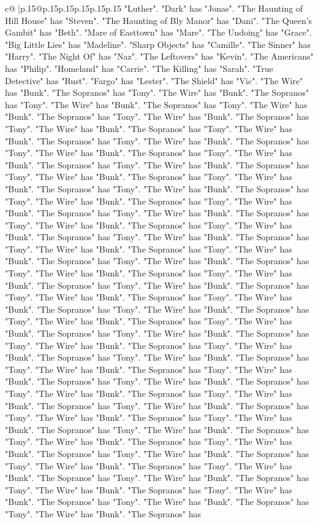 \documentclass{article}
\begin{document}
{\begin{supertabular}{c@{$\;$}|p{.15\linewidth}@{}p{.15\linewidth}p{.15\linewidth}p{.15\linewidth}p{.15\linewidth}p{.15\linewidth}}
{{{"Luther". "Dark" has "Jonas". "The Haunting of Hill House" has "Steven". "The Haunting of Bly Manor" has "Dani". "The Queen's Gambit" has "Beth". "Mare of Easttown" has "Mare". "The Undoing" has "Grace". "Big Little Lies" has "Madeline". "Sharp Objects" has "Camille". "The Sinner" has "Harry". "The Night Of" has "Naz". "The Leftovers" has "Kevin". "The Americans" has "Philip". "Homeland" has "Carrie". "The Killing" has "Sarah". "True Detective" has "Rust". "Fargo" has "Lester". "The Shield" has "Vic". "The Wire" has "Bunk". "The Sopranos" has "Tony". "The Wire" has "Bunk". "The Sopranos" has "Tony". "The Wire" has "Bunk". "The Sopranos" has "Tony". "The Wire" has "Bunk". "The Sopranos" has "Tony". "The Wire" has "Bunk". "The Sopranos" has "Tony". "The Wire" has "Bunk". "The Sopranos" has "Tony". "The Wire" has "Bunk". "The Sopranos" has "Tony". "The Wire" has "Bunk". "The Sopranos" has "Tony". "The Wire" has "Bunk". "The Sopranos" has "Tony". "The Wire" has "Bunk". "The Sopranos" has "Tony". "The Wire" has "Bunk". "The Sopranos" has "Tony". "The Wire" has "Bunk". "The Sopranos" has "Tony". "The Wire" has "Bunk". "The Sopranos" has "Tony". "The Wire" has "Bunk". "The Sopranos" has "Tony". "The Wire" has "Bunk". "The Sopranos" has "Tony". "The Wire" has "Bunk". "The Sopranos" has "Tony". "The Wire" has "Bunk". "The Sopranos" has "Tony". "The Wire" has "Bunk". "The Sopranos" has "Tony". "The Wire" has "Bunk". "The Sopranos" has "Tony". "The Wire" has "Bunk". "The Sopranos" has "Tony". "The Wire" has "Bunk". "The Sopranos" has "Tony". "The Wire" has "Bunk". "The Sopranos" has "Tony". "The Wire" has "Bunk". "The Sopranos" has "Tony". "The Wire" has "Bunk". "The Sopranos" has "Tony". "The Wire" has "Bunk". "The Sopranos" has "Tony". "The Wire" has "Bunk". "The Sopranos" has "Tony". "The Wire" has "Bunk". "The Sopranos" has "Tony". "The Wire" has "Bunk". "The Sopranos" has "Tony". "The Wire" has "Bunk". "The Sopranos" has "Tony". "The Wire" has "Bunk". "The Sopranos" has "Tony". "The Wire" has "Bunk". "The Sopranos" has "Tony". "The Wire" has "Bunk". "The Sopranos" has "Tony". "The Wire" has "Bunk". "The Sopranos" has "Tony". "The Wire" has "Bunk". "The Sopranos" has "Tony". "The Wire" has "Bunk". "The Sopranos" has "Tony". "The Wire" has "Bunk". "The Sopranos" has "Tony". "The Wire" has "Bunk". "The Sopranos" has "Tony". "The Wire" has "Bunk". "The Sopranos" has "Tony". "The Wire" has "Bunk". "The Sopranos" has "Tony". "The Wire" has "Bunk". "The Sopranos" has "Tony". "The Wire" has "Bunk". "The Sopranos" has "Tony". "The Wire" has "Bunk". "The Sopranos" has "Tony". "The Wire" has "Bunk". "The Sopranos" has "Tony". "The Wire" has "Bunk". "The Sopranos" has "Tony". "The Wire" has "Bunk". "The Sopranos" has "Tony". "The Wire" has "Bunk". "The Sopranos" has "Tony". "The Wire" has "Bunk". "The Sopranos" has "Tony". "The Wire" has "Bunk". "The Sopranos" has "Tony". "The Wire" has "Bunk". "The Sopranos" has "Tony". "The Wire" has "Bunk". "The Sopranos" has "Tony". "The Wire" has "Bunk". "The Sopranos" has "Tony". "The Wire" has "Bunk". "The Sopranos" has "Tony". "The Wire" has "Bunk". "The Sopranos" has "Tony". "The Wire" has "Bunk". "The Sopranos" has }}}
\end{supertabular}}
\end{document}
